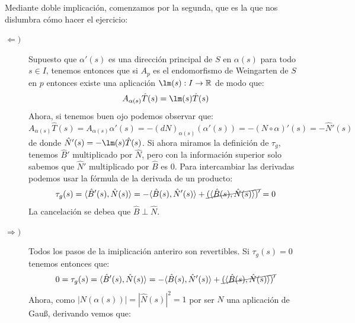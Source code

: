 \documentclass[12pt]{article}
\begin{document}
\begin{ejercicio}
\begin{enumerate}[label=\alph*)]
                Mediante doble implicación, comenzamos por la segunda, que es la que nos dislumbra cómo hacer el ejercicio:
                \begin{description}
                    \item [$\Longleftarrow )$] Supuesto que $\alpha'(s)$ es una dirección principal de $S$ en $\alpha(s)$ para todo $s\in I$, tenemos entonces que si $A_p$ es el endomorfismo de Weingarten de $S$ en $p$ entonces existe una aplicación $\lm(s):I\to\mathbb{R}$ de modo que:
                        \begin{equation*}
                            A_{\alpha(s)}\hat{T}(s) = \lm(s) \hat{T}(s)
                        \end{equation*}
                        Ahora, si tenemos buen ojo podemos observar que:
                        \begin{equation*}
                            A_{\alpha(s)}\hat{T}(s) = A_{\alpha(s)}\alpha'(s) = -(dN)_{\alpha(s)}(\alpha'(s)) = -(N\circ \alpha)'(s) = -\hat{N}'(s)
                        \end{equation*}
                        de donde $\hat{N}'(s) = -\lm(s)\hat{T}(s)$. Si ahora miramos la definición de $\tau_g$, tenemos $\hat{B}'$ multiplicado por $\hat{N}$, pero con la información superior solo sabemos que $\hat{N}'$ multiplicado por $\hat{B}$ es $0$. Para intercambiar las derivadas podemos usar la fórmula de la derivada de un producto:
                        \begin{equation*}
                            \tau_g(s) = \langle \hat{B}'(s), \hat{N}(s) \rangle = -\langle \hat{B}(s),\hat{N}'(s) \rangle + \cancel{(\langle \hat{B}(s),\hat{N}(s) \rangle )'} = 0
                        \end{equation*}
                        La cancelación se debea que $\hat{B}\perp \hat{N}$.
                    \item [$\Longrightarrow )$] Todos los pasos de la imiplicación anteriro son revertibles. Si $\tau_g(s) = 0$ tenemos entonces que:
                        \begin{equation*}
                            0 = \tau_g(s) = \langle \hat{B}'(s), \hat{N}(s) \rangle = -\langle \hat{B}(s),\hat{N}'(s) \rangle + \cancel{(\langle \hat{B}(s),\hat{N}(s) \rangle )'} 
                        \end{equation*}
                        Ahora, como $|N(\alpha(s))| = |\hat{N}(s)|^2 = 1$ por ser $N$ una aplicación de Gau\ss, derivando vemos que:
                        \begin{equation*}

\end{equation*}
\end{description}
\end{enumerate}
\end{ejercicio}
\end{document}
